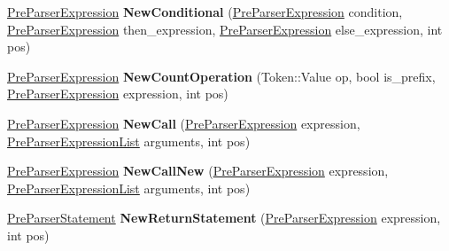 \begin{DoxyCompactItemize}
\item 
\hypertarget{classv8_1_1internal_1_1_pre_parser_factory_ac63b1c1172261f9b62ee11726fc5c3d9}{}\hyperlink{classv8_1_1internal_1_1_pre_parser_expression}{Pre\+Parser\+Expression} {\bfseries New\+Conditional} (\hyperlink{classv8_1_1internal_1_1_pre_parser_expression}{Pre\+Parser\+Expression} condition, \hyperlink{classv8_1_1internal_1_1_pre_parser_expression}{Pre\+Parser\+Expression} then\+\_\+expression, \hyperlink{classv8_1_1internal_1_1_pre_parser_expression}{Pre\+Parser\+Expression} else\+\_\+expression, int pos)\label{classv8_1_1internal_1_1_pre_parser_factory_ac63b1c1172261f9b62ee11726fc5c3d9}

\item 
\hypertarget{classv8_1_1internal_1_1_pre_parser_factory_afcc21d34ee225658881c7d8241e8e6d6}{}\hyperlink{classv8_1_1internal_1_1_pre_parser_expression}{Pre\+Parser\+Expression} {\bfseries New\+Count\+Operation} (Token\+::\+Value op, bool is\+\_\+prefix, \hyperlink{classv8_1_1internal_1_1_pre_parser_expression}{Pre\+Parser\+Expression} expression, int pos)\label{classv8_1_1internal_1_1_pre_parser_factory_afcc21d34ee225658881c7d8241e8e6d6}

\item 
\hypertarget{classv8_1_1internal_1_1_pre_parser_factory_ab448811c02c34e1c7a408e2209517b36}{}\hyperlink{classv8_1_1internal_1_1_pre_parser_expression}{Pre\+Parser\+Expression} {\bfseries New\+Call} (\hyperlink{classv8_1_1internal_1_1_pre_parser_expression}{Pre\+Parser\+Expression} expression, \hyperlink{classv8_1_1internal_1_1_pre_parser_expression_list}{Pre\+Parser\+Expression\+List} arguments, int pos)\label{classv8_1_1internal_1_1_pre_parser_factory_ab448811c02c34e1c7a408e2209517b36}

\item 
\hypertarget{classv8_1_1internal_1_1_pre_parser_factory_a37f894157d7462dc016411e449766904}{}\hyperlink{classv8_1_1internal_1_1_pre_parser_expression}{Pre\+Parser\+Expression} {\bfseries New\+Call\+New} (\hyperlink{classv8_1_1internal_1_1_pre_parser_expression}{Pre\+Parser\+Expression} expression, \hyperlink{classv8_1_1internal_1_1_pre_parser_expression_list}{Pre\+Parser\+Expression\+List} arguments, int pos)\label{classv8_1_1internal_1_1_pre_parser_factory_a37f894157d7462dc016411e449766904}

\item 
\hypertarget{classv8_1_1internal_1_1_pre_parser_factory_a29d43aa30fcd3b3b4d0092c040dd266e}{}\hyperlink{classv8_1_1internal_1_1_pre_parser_statement}{Pre\+Parser\+Statement} {\bfseries New\+Return\+Statement} (\hyperlink{classv8_1_1internal_1_1_pre_parser_expression}{Pre\+Parser\+Expression} expression, int pos)\label{classv8_1_1internal_1_1_pre_parser_factory_a29d43aa30fcd3b3b4d0092c040dd266e}


\end{DoxyCompactItemize}
